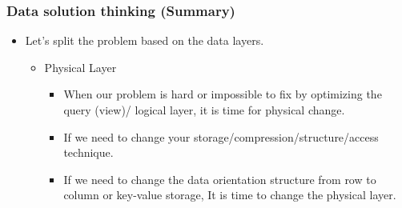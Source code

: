 \begin{frame}
  \frametitle{Data solution thinking (Summary) }
  \begin{itemize}[<+->]
  \item Let's split the problem based on the data layers.
    \begin{itemize}[<+->]
    \item Physical Layer
      \begin{itemize}[<+->]
      \item When our problem is hard or impossible to fix by optimizing the query (view)/ logical layer, it is time for physical change.
      \item If we need to change your storage/compression/structure/access technique.
      \item If we need to change the data orientation structure from row to column or key-value storage, It is time to change the physical layer.
      \end{itemize}
    \end{itemize}
  \end{itemize}
 \end{frame}






